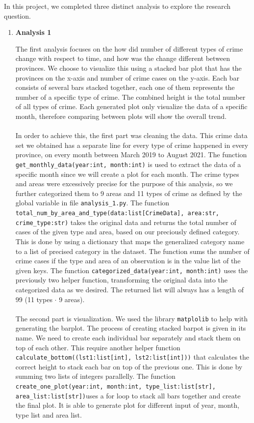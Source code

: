 \documentclass[fontsize=11pt]{article}
\begin{document}
In this project, we completed three distinct analysis to explore the research question. 
\begin{enumerate}
\item \textbf{Analysis 1}

The first analysis focuses on the how did number of different types of crime change with respect to time, and how was the change different between provinces. We choose to visualize this using a stacked bar plot that has the provinces on the x-axis and number of crime cases on the y-axis. Each bar consists of several bars stacked together, each one of them represents the number of a specific type of crime. The combined height is the total number of all types of crime. Each generated plot only visualize the data of a specific month, therefore comparing between plots will show the overall trend. 
\\
\\
In order to achieve this, the first part was cleaning the data. This crime data set we obtained has a separate line for every type of crime happened in every province, on every month between March 2019 to August 2021. The function \texttt{get\_monthly\_data(year:int, month:int)} is used to extract the data of a specific month since we will create a plot for each month. The crime types and areas were excessively precise for the purpose of this analysis, so we further categorized them to 9 areas and 11 types of crime as defined by the global variable in file \texttt{analysis\_1.py}. The function \texttt{total\_num\_by\_area\_and\_type(data:list[CrimeData], area:str, crime\_type:str)} takes the original data and returns the total number of cases of the given type and area, based on our preciously defined category. This is done by using a dictionary that maps the generalized category name to a list of precised category in the dataset. The function sums the number of crime cases if the type and area of an observation is in the value list of the given keys. The function \texttt{categorized\_data(year:int, month:int)} uses the previously two helper function, transforming the original data into the categorized data as we desired. The returned list will always has a length of 99 (11 types $\cdot$ 9 areas).
\\
\\
The second part is visualization. We used the library \texttt{matplolib} to help with generating the barplot. The process of creating stacked barpot is given in its name. We need to create each individual bar separately and stack them on top of each other. This require another helper function \texttt{calculate\_bottom((lst1:list[int], lst2:list[int]))} that calculates the correct height to stack each bar on top of the previous one. This is done by summing two lists of integers parallelly. The function \texttt{create\_one\_plot(year:int, month:int, type\_list:list[str], area\_list:list[str])}uses a for loop to stack all bars together and create the final plot. It is able to generate plot for different input of year, month, type list and area list.

\end{enumerate}
\end{document}
